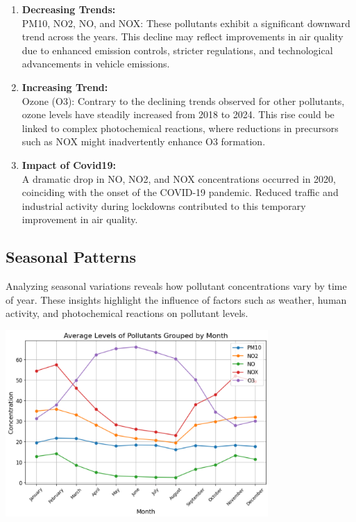 \documentclass{modeleRapport}
\begin{document}
\begin{enumerate}
    \item \textbf{Decreasing Trends: }\\
    PM10, NO2, NO, and NOX: These pollutants exhibit a significant downward trend across the years. 
    This decline may reflect improvements in air quality due to enhanced emission controls, stricter regulations, 
    and technological advancements in vehicle emissions.\\
    \item \textbf{Increasing Trend:}\\
    Ozone (O3): Contrary to the declining trends observed for other pollutants, ozone levels have steadily increased 
    from 2018 to 2024. This rise could be linked to complex photochemical reactions, where reductions in precursors 
    such as NOX might inadvertently enhance O3 formation.\\
    \item \textbf{Impact of Covid19:}\\
    A dramatic drop in NO, NO2, and NOX concentrations occurred in 2020, coinciding with the onset of the COVID-19 pandemic. 
    Reduced traffic and industrial activity during lockdowns contributed to this temporary improvement in air quality.\\
\end{enumerate}


\subsection{Seasonal Patterns}

Analyzing seasonal variations reveals how pollutant concentrations vary by time of year. 
These insights highlight the influence of factors such as weather, human activity, and photochemical 
reactions on pollutant levels.\\

\begin{center}
    \includegraphics[width=10cm]{Images/PollutantsPerMonth.png}
\end{center}
\end{document}
